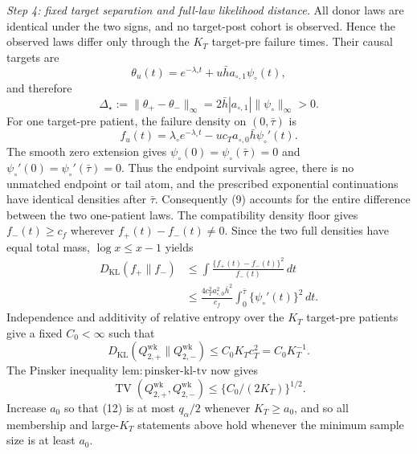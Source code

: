 \emph{Step 4: fixed target separation and full-law likelihood distance.}
All donor laws are identical under the two signs, and no target-post cohort
is observed.  Hence the observed laws differ only through the \(K_T\)
target-pre failure times.  Their causal targets are
\[
 \theta_u(t)=e^{-\lambda_\circ t}
             +u\bar h a_{\circ,1}\psi_\circ(t),
\]
and therefore
\[
 \Delta_\star:=\|\theta_+-\theta_-\|_\infty
 =2\bar h|a_{\circ,1}|\|\psi_\circ\|_\infty>0.        \tag{8}
\]
For one target-pre patient, the failure density on \((0,\bar\tau)\) is
\[
 f_u(t)=\lambda_\circ e^{-\lambda_\circ t}
       -u c_Ta_{\circ,0}\bar h\psi_\circ'(t).          \tag{9}
\]
The smooth zero extension gives
\(\psi_\circ(0)=\psi_\circ(\bar\tau)=0\) and
\(\psi_\circ'(0)=\psi_\circ'(\bar\tau)=0\).  Thus the endpoint
survivals agree, there is no unmatched endpoint or tail atom, and the
prescribed exponential continuations have identical densities after
\(\bar\tau\).  Consequently (9) accounts for the entire difference
between the two one-patient laws.  The compatibility density floor gives
\(f_-(t)\ge c_f\) wherever \(f_+(t)-f_-(t)\ne0\).  Since the two full
densities have equal total mass, \(\log x\le x-1\) yields
\[
 \begin{aligned}
 D_{\mathrm{KL}}(f_+\|f_-)
 &\le\int\frac{\{f_+(t)-f_-(t)\}^2}{f_-(t)}\,dt\\
 &\le\frac{4c_T^2a_{\circ,0}^2\bar h^2}{c_f}
       \int_0^{\bar\tau}\{\psi_\circ'(t)\}^2\,dt.
 \end{aligned}                                          \tag{10}
\]
Independence and additivity of relative entropy over the \(K_T\)
target-pre patients give a fixed \(C_0<\infty\) such that
\[
 D_{\mathrm{KL}}(Q_{2,+}^{\mathrm{wk}}\|Q_{2,-}^{\mathrm{wk}})
 \le C_0K_Tc_T^2=C_0K_T^{-1}.                           \tag{11}
\]
The Pinsker inequality
\(\mathrm{lem:pinsker\mbox{-}kl\mbox{-}tv}\) now gives
\[
 \operatorname{TV}(Q_{2,+}^{\mathrm{wk}},Q_{2,-}^{\mathrm{wk}})
 \le\{C_0/(2K_T)\}^{1/2}.                              \tag{12}
\]
Increase \(a_0\) so that (12) is at most \(q_\alpha/2\) whenever
\(K_T\ge a_0\), and so all membership and large-\(K_T\) statements above
hold whenever the minimum sample size is at least \(a_0\).

